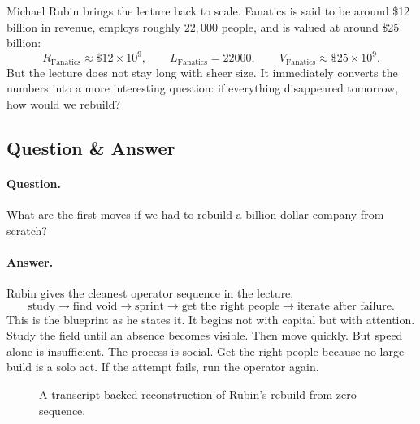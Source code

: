 Michael Rubin brings the lecture back to scale. Fanatics is said to be around \$12 billion in revenue, employs roughly \(22{,}000\) people, and is valued at around \$25 billion:
\begin{equation}
R_{\mathrm{Fanatics}}\approx \$12\times 10^9,\qquad
L_{\mathrm{Fanatics}}=22000,\qquad
V_{\mathrm{Fanatics}}\approx \$25\times 10^9.
\end{equation}
But the lecture does not stay long with sheer size. It immediately converts the numbers into a more interesting question: if everything disappeared tomorrow, how would we rebuild?

\subsection{Question \& Answer}

\paragraph{Question.} What are the first moves if we had to rebuild a billion-dollar company from scratch?

\paragraph{Answer.} Rubin gives the cleanest operator sequence in the lecture:
\begin{equation}
\text{study}\to\text{find void}\to\text{sprint}\to\text{get the right people}\to\text{iterate after failure}.
\end{equation}
This is the blueprint as he states it. It begins not with capital but with attention. Study the field until an absence becomes visible. Then move quickly. But speed alone is insufficient. The process is social. Get the right people because no large build is a solo act. If the attempt fails, run the operator again.

\begin{figure}
\centering
{}
\caption{A transcript-backed reconstruction of Rubin's rebuild-from-zero sequence.}
\end{figure}


